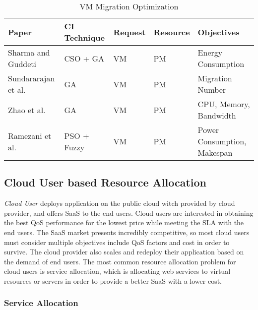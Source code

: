 \documentclass[onecolumn,10pt]{asme2ej}
\begin{document}
\begin{table}[H]
\begin{center}
\begin{tabular}[b]{|l|llll}
\rowcolor[gray]{.4}
\color{white}Paper    							  & \color{white}CI Technique & \color{white}Request     & \color{white}Resource    &\color{white}Objectives  \\ \hline 
Sharma and Guddeti \cite{sharma2016demand}    	  & CSO + GA 				  & VM                       & PM   			        & Energy Consumption \\ \hline
Sundararajan et al.\cite{sundararajan2015constrained} & GA     			      & VM  			         & PM  						& Migration Number \\ \hline
Zhao et al. \cite{zhao2011multi}                  & GA       				  & VM       				 & PM 						& CPU, Memory, Bandwidth	\\ \hline
Ramezani et al. \cite{ramezani2016multi}          & PSO + Fuzzy      		  & VM              		 & PM 						& Power Consumption, Makespan  \\
\end{tabular}
\end{center}
\caption{VM Migration Optimization}
\label{VMmig}
\end{table}

\subsection{Cloud User based Resource Allocation}
\emph{Cloud User} deploys application on the public cloud witch provided by cloud provider, and offers SaaS to the end users. Cloud users are interested in obtaining the best QoS performance for the lowest price while meeting the SLA with the end users. The SaaS market presents incredibly competitive, so most cloud users must consider multiple objectives include QoS factors and cost in order to survive. The cloud provider also scales and redeploy their application based on the demand of end users. The most common resource allocation problem for cloud users is service allocation, which is allocating web services to virtual resources or servers in order to provide a better SaaS with a lower cost.

\subsubsection{Service Allocation}
\end{document}
